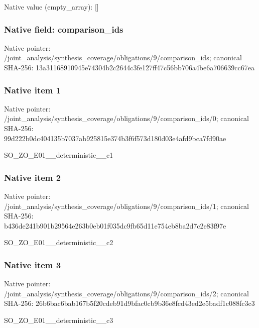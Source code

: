 \documentclass[10pt,a4paper]{article}
\begin{document}
Native value (empty\_\allowbreak{}array): []

\subsubsection{Native field: comparison\_\allowbreak{}ids}
Native pointer: /joint\_\allowbreak{}analysis/synthesis\_\allowbreak{}coverage/obligations/9/comparison\_\allowbreak{}ids; canonical SHA-256: 13a31168910945e74304b2c2644c3fe127ff47c56bb706a4be6a706639cc67ea

\subsubsection{Native item 1}
Native pointer: /joint\_\allowbreak{}analysis/synthesis\_\allowbreak{}coverage/obligations/9/comparison\_\allowbreak{}ids/0; canonical SHA-256: 99d222b0dc404135b7037ab925815e374b3f6f573d180d03e4afd9bca7fd90ae

\begingroup\raggedright\sloppy SO\_\allowbreak{}ZO\_\allowbreak{}E01\_\allowbreak{}\_\allowbreak{}deterministic\_\allowbreak{}\_\allowbreak{}c1\par\endgroup

\subsubsection{Native item 2}
Native pointer: /joint\_\allowbreak{}analysis/synthesis\_\allowbreak{}coverage/obligations/9/comparison\_\allowbreak{}ids/1; canonical SHA-256: b436de241b901b29564e263b0eb01f035dc9fb65d11e754eb8ba2d7c2e83f97e

\begingroup\raggedright\sloppy SO\_\allowbreak{}ZO\_\allowbreak{}E01\_\allowbreak{}\_\allowbreak{}deterministic\_\allowbreak{}\_\allowbreak{}c2\par\endgroup

\subsubsection{Native item 3}
Native pointer: /joint\_\allowbreak{}analysis/synthesis\_\allowbreak{}coverage/obligations/9/comparison\_\allowbreak{}ids/2; canonical SHA-256: 26b6bac6bab167b5f20cdeb91d9bfac0cb9b36e8fcd43ed2e5badf1c088fc3c3

\begingroup\raggedright\sloppy SO\_\allowbreak{}ZO\_\allowbreak{}E01\_\allowbreak{}\_\allowbreak{}deterministic\_\allowbreak{}\_\allowbreak{}c3\par\endgroup
\end{document}

